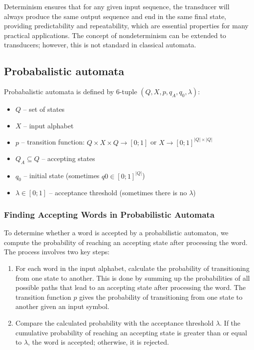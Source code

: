 \documentclass[hidelinks,12pt]{article}
\begin{document}
Determinism ensures that for any given input sequence, the transducer will
always produce the same output sequence and end in the same final state,
providing predictability and repeatability, which are essential properties for
many practical applications.
The concept of nondeterminism can be extended to transducers; however, this is not standard in classical automata.

\subsection{Probabalistic automata}

Probabalistic automata is defined by 6-tuple $(Q,X,p,q_A, q_0, \lambda)$:

\begin{itemize}
	\item $Q$ – set of states
	\item $X$ – input alphabet
	\item $p$ – transition function: $Q \times X \times Q → [0;1]$ or $X \to {[0;1]}^{|Q|\times|Q|}$
	\item $Q_A \subseteq Q$ – accepting states
	\item $q_0$ – initial state (sometimes $q0 \in [0;1]^{|Q|}$)
	\item $\lambda \in [0;1]$ – acceptance threshold (sometimes there is no $\lambda$) 
\end{itemize}

\subsubsection{Finding Accepting Words in Probabilistic Automata}

To determine whether a word is accepted by a probabilistic automaton, we
compute the probability of reaching an accepting state after processing the
word. The process involves two key steps:

\begin{enumerate}
    \item For each word in the input alphabet, calculate the probability of transitioning from one state to another. This is done by summing up the probabilities of all possible paths that lead to an accepting state after processing the word. The transition function $p$ gives the probability of transitioning from one state to another given an input symbol.
    \item Compare the calculated probability with the acceptance threshold $\lambda$. If the cumulative probability of reaching an accepting state is greater than or equal to $\lambda$, the word is accepted; otherwise, it is rejected.
\end{enumerate}
\end{document}
